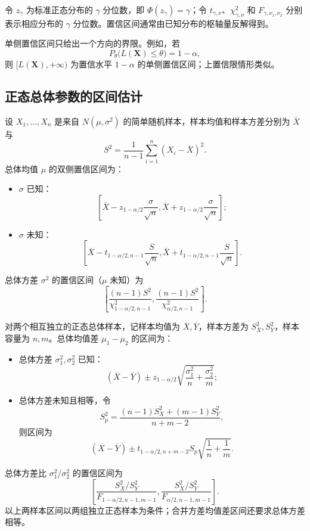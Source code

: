 \documentclass[11pt,a4paper,fontset=fandol]{ctexart}
\theoremstyle{remark}
\begin{document}
令 $z_\gamma$ 为标准正态分布的 $\gamma$ 分位数，即 $\Phi(z_\gamma)=\gamma$；令 $t_{\gamma,\nu}$、$\chi^2_{\gamma,\nu}$ 和 $F_{\gamma,\nu_1,\nu_2}$ 分别表示相应分布的 $\gamma$ 分位数。置信区间通常由已知分布的枢轴量反解得到。

单侧置信区间只给出一个方向的界限。例如，若
\[
    P_\theta\bigl(L(\bm X)\leq\theta\bigr)=1-\alpha,
\]
则 $[L(\bm X),+\infty)$ 为置信水平 $1-\alpha$ 的单侧置信区间；上置信限情形类似。

\subsection{正态总体参数的区间估计}
设 $X_1,\ldots,X_n$ 是来自 $N(\mu,\sigma^2)$ 的简单随机样本，样本均值和样本方差分别为 $\overline X$ 与
\[
    S^2=\frac1{n-1}\sum_{i=1}^{n}(X_i-\overline X)^2.
\]
总体均值 $\mu$ 的双侧置信区间为：
\begin{itemize}
    \item $\sigma$ 已知：
    \[
        \left[
        \overline X-z_{1-\alpha/2}\frac{\sigma}{\sqrt n},
        \overline X+z_{1-\alpha/2}\frac{\sigma}{\sqrt n}
        \right];
    \]
    \item $\sigma$ 未知：
    \[
        \left[
        \overline X-t_{1-\alpha/2,n-1}\frac{S}{\sqrt n},
        \overline X+t_{1-\alpha/2,n-1}\frac{S}{\sqrt n}
        \right].
    \]
\end{itemize}
总体方差 $\sigma^2$ 的置信区间（$\mu$ 未知）为
\[
    \left[
        \frac{(n-1)S^2}{\chi^2_{1-\alpha/2,n-1}},
        \frac{(n-1)S^2}{\chi^2_{\alpha/2,n-1}}
    \right].
\]

对两个相互独立的正态总体样本，记样本均值为 $\overline X,\overline Y$，样本方差为 $S_X^2,S_Y^2$，样本容量为 $n,m$。总体均值差 $\mu_1-\mu_2$ 的区间为：
\begin{itemize}
    \item 总体方差 $\sigma_1^2,\sigma_2^2$ 已知：
    \[
        (\overline X-\overline Y)
        \pm z_{1-\alpha/2}
        \sqrt{\frac{\sigma_1^2}{n}+\frac{\sigma_2^2}{m}};
    \]
    \item 总体方差未知且相等，令
    \[
        S_p^2=\frac{(n-1)S_X^2+(m-1)S_Y^2}{n+m-2},
    \]
    则区间为
    \[
        (\overline X-\overline Y)
        \pm t_{1-\alpha/2,n+m-2}S_p\sqrt{\frac1n+\frac1m}.
    \]
\end{itemize}
总体方差比 $\sigma_1^2/\sigma_2^2$ 的置信区间为
\[
    \left[
        \frac{S_X^2/S_Y^2}{F_{1-\alpha/2,n-1,m-1}},
        \frac{S_X^2/S_Y^2}{F_{\alpha/2,n-1,m-1}}
    \right].
\]
以上两样本区间以两组独立正态样本为条件；合并方差均值差区间还要求总体方差相等。
\end{document}
